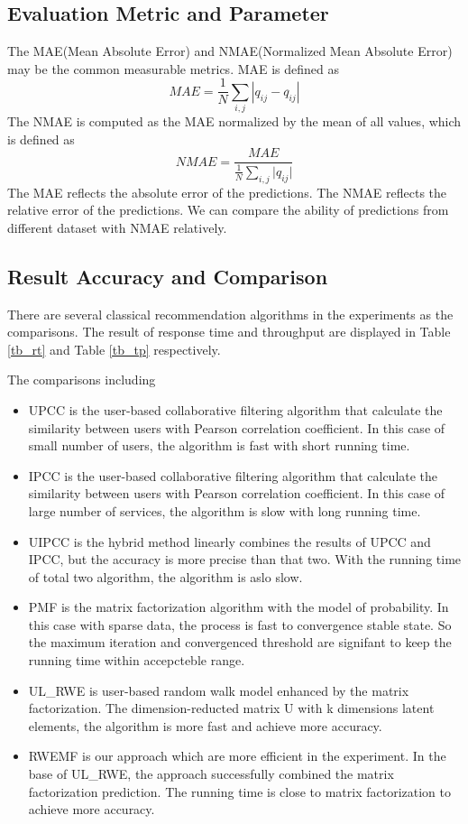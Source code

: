 \documentclass[conference]{IEEEtran}
\begin{document}
\subsection{Evaluation Metric and Parameter}
The MAE(Mean Absolute Error) and NMAE(Normalized Mean Absolute Error) may be the common measurable metrics. MAE is defined as 
\begin{equation}
MAE=\frac{1}{N}\sum_{i,j}{|q_{ij}-q^{\hat{}}_{ij}|}
\end{equation}
The NMAE is computed as the MAE normalized by the mean of all values, which is defined as 
\begin{equation}
NMAE=\frac{MAE}{\frac{1}{N}\sum_{i,j}{|q_{ij}}|}
\end{equation}
The MAE reflects the absolute error of the predictions. The NMAE reflects the relative error of the predictions. We can compare the ability of predictions from different dataset with NMAE relatively.

\subsection{Result Accuracy and Comparison}
\par There are several classical recommendation algorithms in the experiments as the comparisons. The result of response time and throughput
 are displayed in Table \ref{tb_rt} and Table \ref{tb_tp} respectively.
\par The comparisons including
\begin{itemize}
\item UPCC is the user-based collaborative filtering algorithm that calculate the similarity between users with Pearson correlation coefficient. In this case of small number of users, the algorithm is fast with short running time. 
\item IPCC is the user-based collaborative filtering algorithm that calculate the similarity between users with Pearson correlation coefficient. In this case of large number of services, the algorithm is slow with long running time. 
\item UIPCC is the hybrid method linearly combines the results of UPCC and IPCC, but the accuracy is more precise than that two. With the running time of total two algorithm, the algorithm is aslo slow.
\item PMF is the matrix factorization algorithm with the model of probability. In this case with sparse data, the process is fast to convergence stable state. So the maximum iteration and convergenced threshold are signifant to keep the running time within accepcteble range.
\item UL\_RWE is user-based random walk model enhanced by the matrix factorization. The dimension-reducted matrix U with k dimensions latent elements, the algorithm is more fast and achieve more accuracy.
\item RWEMF is our approach which are more efficient in the experiment. In the base of UL\_RWE, the approach successfully combined the matrix factorization prediction. The running time is close to matrix factorization to achieve more accuracy.
\end{itemize}
\end{document}

